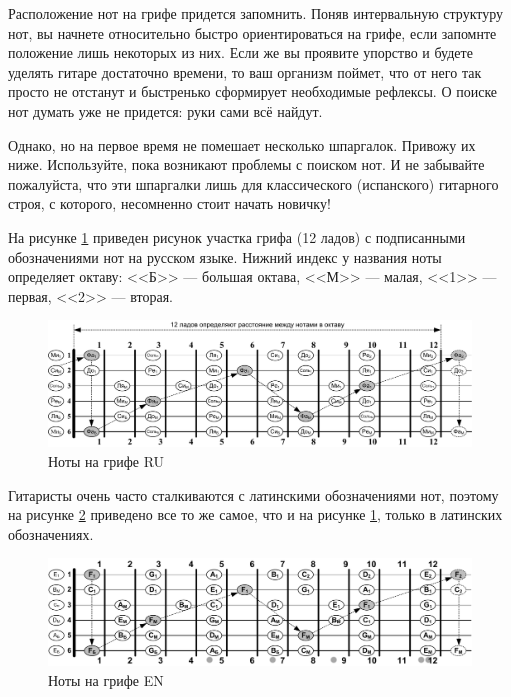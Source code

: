 Расположение нот на грифе придется запомнить. Поняв интервальную структуру нот, вы начнете относительно быстро ориентироваться на грифе, если запомнте положение лишь некоторых из них. Если же вы проявите упорство и будете уделять гитаре достаточно времени, то ваш организм поймет, что от него так просто не отстанут и быстренько сформирует необходимые рефлексы. О поиске нот думать уже не придется: руки сами всё найдут. 

Однако, но на первое время не помешает несколько шпаргалок. Привожу их ниже. Используйте, пока возникают проблемы с поиском нот. И не забывайте пожалуйста, что эти шпаргалки лишь для классического (испанского) гитарного строя, с которого, несомненно стоит начать новичку!

На рисунке \ref{fig:guitar:notes-on-griph-ru} приведен рисунок участка грифа (12 ладов) с подписанными обозначениями нот на русском языке. Нижний индекс у названия ноты определяет октаву: <<Б>> --- большая октава, <<М>> --- малая, <<1>> --- первая, <<2>> --- вторая.

\begin{figure}[!ht]
    \centering
    \includegraphics[width=\textwidth]{fig/notes-on-griph-ru} 
    \caption{Ноты на грифе RU}\label{fig:guitar:notes-on-griph-ru}
\end{figure} 

Гитаристы очень часто сталкиваются с латинскими обозначениями нот, поэтому на рисунке \ref{fig:guitar:notes-on-griph-lat} приведено все то же самое, что и на рисунке \ref{fig:guitar:notes-on-griph-ru}, только в латинских обозначениях.

\begin{figure}[!ht]
    \centering
    \includegraphics[width=\textwidth]{fig/notes-on-griph-lat} 
    \caption{Ноты на грифе EN}\label{fig:guitar:notes-on-griph-lat}
\end{figure} 

